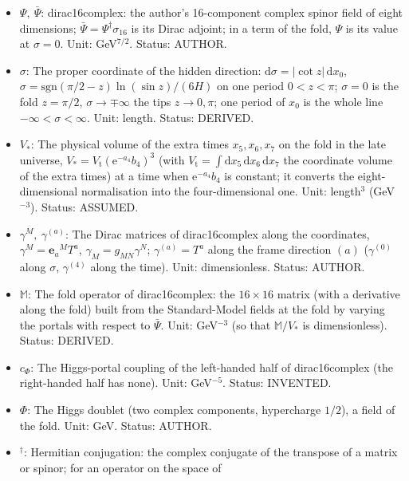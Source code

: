 \documentclass[
  10pt,
]{article}
\providecommand{\tightlist}{%
  \setlength{\itemsep}{0pt}\setlength{\parskip}{0pt}}
\begin{document}
\begin{itemize}
\tightlist
\item
  \(\Psi,\ \bar\Psi\): dirac16complex: the author's 16-component complex
  spinor field of eight dimensions;
  \(\bar\Psi = \Psi^\dagger\sigma_{16}\) is its Dirac adjoint; in a term
  of the fold, \(\Psi\) is its value at \(\sigma = 0\). Unit:
  GeV\(^{7/2}\). Status: AUTHOR.
\item
  \(\sigma\): The proper coordinate of the hidden direction:
  \(\mathrm{d}\sigma = \lvert\cot z\rvert\,\mathrm{d}x_0\),
  \(\sigma = \mathrm{sgn}(\pi/2 - z)\ln(\sin z)/(6H)\) on one period
  \(0 < z < \pi\); \(\sigma = 0\) is the fold \(z = \pi/2\),
  \(\sigma \to \mp\infty\) the tips \(z \to 0, \pi\); one period of
  \(x_0\) is the whole line \(-\infty < \sigma < \infty\). Unit: length.
  Status: DERIVED.
\item
  \(V_*\): The physical volume of the extra times \(x_5, x_6, x_7\) on
  the fold in the late universe,
  \(V_* = V_{\mathrm{t}}(\mathrm{e}^{-a_4}b_4)^3\) (with
  \(V_{\mathrm{t}} = \int\mathrm{d}x_5\,\mathrm{d}x_6\,\mathrm{d}x_7\)
  the coordinate volume of the extra times) at a time when
  \(\mathrm{e}^{-a_4}b_4\) is constant; it converts the
  eight-dimensional normalisation into the four-dimensional one. Unit:
  length\(^3\) (GeV\(^{-3}\)). Status: ASSUMED.
\item
  \(\gamma^M,\ \gamma^{(a)}\): The Dirac matrices of dirac16complex
  along the coordinates, \(\gamma^M = \mathbf{e}_a{}^MT^a\),
  \(\gamma_M = g_{MN}\gamma^N\); \(\gamma^{(a)} = T^a\) along the frame
  direction \((a)\) (\(\gamma^{(0)}\) along \(\sigma\), \(\gamma^{(4)}\)
  along the time). Unit: dimensionless. Status: AUTHOR.
\item
  \(\mathbb{M}\): The fold operator of dirac16complex: the
  \(16 \times 16\) matrix (with a derivative along the fold) built from
  the Standard-Model fields at the fold by varying the portals with
  respect to \(\bar\Psi\). Unit: GeV\(^{-3}\) (so that
  \(\mathbb{M}/V_*\) is dimensionless). Status: DERIVED.
\item
  \(c_\Phi\): The Higgs-portal coupling of the left-handed half of
  dirac16complex (the right-handed half has none). Unit: GeV\(^{-5}\).
  Status: INVENTED.
\item
  \(\Phi\): The Higgs doublet (two complex components, hypercharge
  \(1/2\)), a field of the fold. Unit: GeV. Status: AUTHOR.
\item
  \({}^\dagger\): Hermitian conjugation: the complex conjugate of the
  transpose of a matrix or spinor; for an operator on the space of

\end{itemize}
\end{document}
